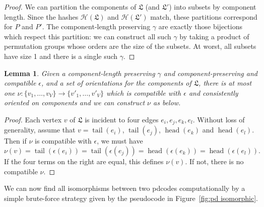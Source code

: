 \documentclass[amsmath,secnumarabic,floatfix,amssymb,nofootinbib,nobibnotes,letterpaper,11pt,tightenlines,showkeys]{revtex4}
\newtheorem{lemma}[theorem]{Lemma}
\theoremstyle{definition}
\newcommand{\head}{\operatorname{head}}
\newcommand{\tail}{\operatorname{tail}}
\begin{document}
\begin{proof}
We can partition the components of $\mathfrak{L}$ (and $\mathfrak{L}'$) into subsets by component length. Since the hashes $\mathcal{H}(\mathfrak{L})$ and $\mathcal{H}(\mathfrak{L}')$ match, these partitions correspond for $P$ and $P'$. The component-length preserving $\gamma$ are exactly those bijections which respect this partition: we can construct all such $\gamma$ by taking a product of permutation groups whose orders are the size of the subsets. At worst, all subsets have size 1 and there is a single such $\gamma$.
\end{proof}

\begin{lemma}
Given a component-length preserving $\gamma$ and component-preserving and compatible $\epsilon$, and a set of orientations for the components of $\mathfrak{L}$, there is at most one $\nu : \{v_1, \dots, v_V\} \rightarrow \{v'_1,\dots,v'_V\}$ which is compatible with $\epsilon$ and consistently oriented on components and we can construct $\nu$ as below.
\end{lemma}

\begin{proof}
Each vertex $v$ of $\mathfrak{L}$ is incident to four edges $e_i, e_j, e_k, e_l$. Without loss of generality, assume that $v = \tail(e_i)$, $\tail(e_j)$, $\head(e_k)$ and $\head(e_l)$. Then if $\nu$ is compatible with $\epsilon$, we must have
\begin{equation*}
\nu(v) = \tail(\epsilon(e_i)) = \tail(\epsilon(e_j)) = \head(\epsilon(e_k)) = \head(\epsilon(e_l)).
\end{equation*}
If the four terms on the right are equal, this defines $\nu(v)$. If not, there is no compatible $\nu$.
\end{proof}

We can now find all isomorphisms between two pdcodes computationally by a simple brute-force strategy given by the pseudocode in Figure~\ref{fig:pd isomorphic}.
\end{document}
